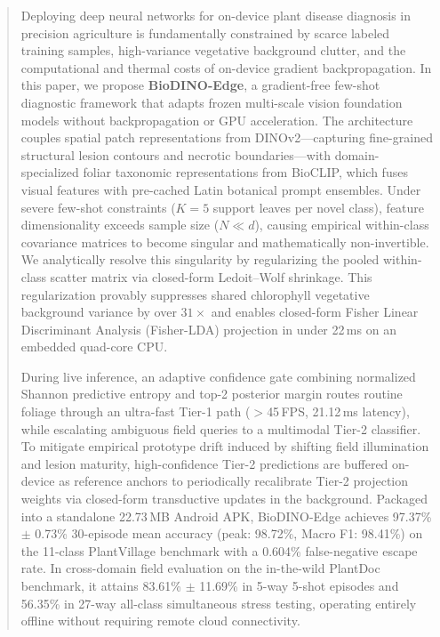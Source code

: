 \documentclass[a4paper,fleqn,nologo]{cas-dc}
\begin{document}
\begin{abstract}
Deploying deep neural networks for on-device plant disease diagnosis in precision agriculture is fundamentally constrained by scarce labeled training samples, high-variance vegetative background clutter, and the computational and thermal costs of on-device gradient backpropagation. In this paper, we propose \textbf{BioDINO-Edge}, a gradient-free few-shot diagnostic framework that adapts frozen multi-scale vision foundation models without backpropagation or GPU acceleration. The architecture couples spatial patch representations from DINOv2---capturing fine-grained structural lesion contours and necrotic boundaries---with domain-specialized foliar taxonomic representations from BioCLIP, which fuses visual features with pre-cached Latin botanical prompt ensembles. Under severe few-shot constraints ($K=5$ support leaves per novel class), feature dimensionality exceeds sample size ($N \ll d$), causing empirical within-class covariance matrices to become singular and mathematically non-invertible. We analytically resolve this singularity by regularizing the pooled within-class scatter matrix via closed-form Ledoit--Wolf shrinkage. This regularization provably suppresses shared chlorophyll vegetative background variance by over $31\times$ and enables closed-form Fisher Linear Discriminant Analysis (Fisher-LDA) projection in under 22\,ms on an embedded quad-core CPU. 

During live inference, an adaptive confidence gate combining normalized Shannon predictive entropy and top-2 posterior margin routes routine foliage through an ultra-fast Tier-1 path ($>$45\,FPS, 21.12\,ms latency), while escalating ambiguous field queries to a multimodal Tier-2 classifier. To mitigate empirical prototype drift induced by shifting field illumination and lesion maturity, high-confidence Tier-2 predictions are buffered on-device as reference anchors to periodically recalibrate Tier-2 projection weights via closed-form transductive updates in the background. Packaged into a standalone 22.73\,MB Android APK, BioDINO-Edge achieves 97.37\% $\pm$ 0.73\% 30-episode mean accuracy (peak: 98.72\%, Macro F1: 98.41\%) on the 11-class PlantVillage benchmark with a 0.604\% false-negative escape rate. In cross-domain field evaluation on the in-the-wild PlantDoc benchmark, it attains 83.61\% $\pm$ 11.69\% in 5-way 5-shot episodes and 56.35\% in 27-way all-class simultaneous stress testing, operating entirely offline without requiring remote cloud connectivity.
\end{abstract}
\end{document}

